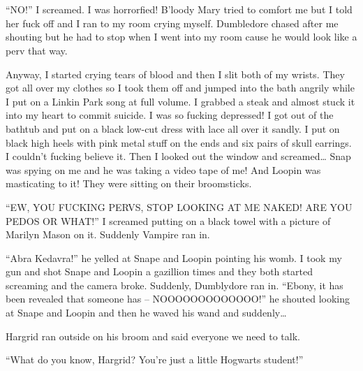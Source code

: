 \section{}



\enquote{NO\@!} I screamed. I was horrorfied! B'loody Mary tried to comfort me but I told her fuck off and I ran to my room crying myself. Dumbledore chased after me shouting but he had to stop when I went into my room cause he would look like a perv that way.

Anyway, I started crying tears of blood and then I slit both of my wrists. They got all over my clothes so I took them off and jumped into the bath angrily while I put on a Linkin Park song at full volume. I grabbed a steak and almost stuck it into my heart to commit suicide. I was so fucking depressed! I got out of the bathtub and put on a black low-cut dress with lace all over it sandly. I put on black high heels with pink metal stuff on the ends and six pairs of skull earrings. I couldn't fucking believe it. Then I looked out the window and screamed\ldots{} Snap was spying on me and he was taking a video tape of me! And Loopin was masticating to it! They were sitting on their broomsticks.

\begin{sloppypar}
    \enquote{EW, YOU FUCKING PERVS, STOP LOOKING AT ME NAKED! ARE YOU PEDOS OR WHAT\@!} I screamed putting on a black towel with a picture of Marilyn Mason on it. Suddenly Vampire ran in.
\end{sloppypar}

\begin{sloppypar}
    \enquote{Abra Kedavra!} he yelled at Snape and Loopin pointing his womb. I took my gun and shot Snape and Loopin a gazillion times and they both started screaming and the camera broke. Suddenly, Dumblydore ran in. \enquote{Ebony, it has been revealed that someone has -- NOOOOOOOOOOOOO\@!} he shouted looking at Snape and Loopin and then he waved his wand and suddenly\ldots{}
\end{sloppypar}

Hargrid ran outside on his broom and said everyone we need to talk.

\enquote{What do you know, Hargrid? You're just a little Hogwarts student!}

